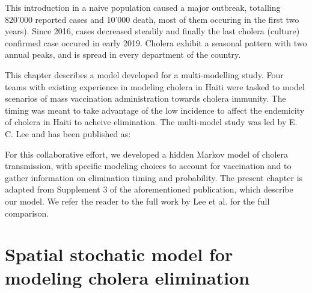 This introduction in a naive population caused a major outbreak, totalling 820'000 reported cases and 10'000 death, most of them occuring in the first two years\cite{Barzilay:CholeraSurveillanceHaiti:2013}).  Since 2016, cases decreased steadily and finally the last cholera (culture) confirmed case occured in early 2019\cite{RepubliquedHaiti:ProfilStatistiqueCholera}. Cholera exhibit a seasonal pattern with two annual peaks, and is spread in every department of the country.

This chapter describes a model developed for a multi-modelling study. Four teams with existing experience in modeling cholera in Haiti were tasked to model scenarios of mass vaccination administration towards cholera immunity. The timing was meant to take advantage of the low incidence to affect the endemicity of cholera in Haiti to acheive elimination. The multi-model study was led by E. C. Lee and has been published as:
\begin{fullwidth}
\end{fullwidth}

For this collaborative effort, we developed a hidden Markov model of cholera transmission, with specific modeling choices to account for vaccination and to gather information on elimination timing and probability.
The present chapter is adapted from Supplement 3 of the aforementioned publication, which describe our model. We refer the reader to the full work by Lee et al. for the full comparison.

\section{Spatial stochatic model for modeling cholera elimination}

